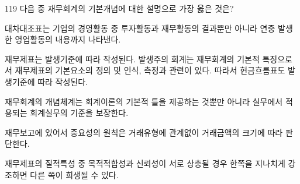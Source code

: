 \begin{question}{119}
다음 중 재무회계의 기본개념에 대한 설명으로 가장 옳은 것은?
\begin{choices}
  \item 대차대조표는 기업의 경영활동 중 투자활동과 재무활동의 결과뿐만 아니라 연중 발생한 영업활동의 내용까지 나타낸다.
  \item 재무제표는 발생기준에 따라 작성된다. 발생주의 회계는 재무회계의 기본적 특징으로서 재무제표의 기본요소의 정의 및 인식, 측정과 관련이 있다. 따라서 현금흐름표도 발생기준에 따라 작성된다.
  \item 재무회계의 개념체계는 회계이론의 기본적 틀을 제공하는 것뿐만 아니라 실무에서 적용되는 회계실무의 기준을 보장한다.
  \item 재무보고에 있어서 중요성의 원칙은 거래유형에 관계없이 거래금액의 크기에 따라 판단한다.
  \item 재무제표의 질적특성 중 목적적합성과 신뢰성이 서로 상충될 경우 한쪽을 지나치게 강조하면 다른 쪽이 희생될 수 있다.
\end{choices}
\end{question}
